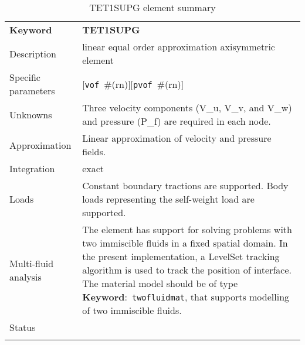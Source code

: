 \documentclass[a4paper]{article}
\newcommand{\descitem}[1]{{\noindent \textbf{#1}}:}
\newcommand{\elemkeyword}[1]{\descitem{Keyword}~\param{#1}} %
\newcommand{\param}[1]{\texttt{#1}} %
\newcommand{\optional}[1]{[#1]} %
\newcommand{\field}[2]{\param{#1}~\#{\tiny(#2)}} %
\newcommand{\optField}[2]{\optional{\field{#1}{#2}}}
\newcommand{\templabel}{}%
\newcommand{\tempcaption}{}%
\newcounter{nelpar}
\newenvironment{elementsummary}[5]{%
  \gdef\tempcaption{#4}%
  \gdef\templabel{#5}%
  \setcounter{nelpar}{0}%
  \begin{center} %
    \begin{table}[!htb] %
      \begin{tabular}{|l|p{9cm}|}\hline %
        {\bf Keyword} & \bf{#1}\\ %
        {Description} & {#2}\\ %
        {Specific parameters} & {#3}\\ \hline %
}{
  \\ \hline %
      \end{tabular}%
      \caption{\tempcaption}%
      \label{\templabel}%
    \end{table}%
  \end{center}%
}
\newcommand{\elementDescription}[2]{{#1} & {#2}\\ }
\begin{document}
\begin{elementsummary}{TET1SUPG}{linear equal order approximation axisymmetric element}
  {\optField{vof}{rn}\optField{pvof}{rn}}{TET1SUPG element summary}{TET1SUPGsummary}
\elementDescription{Unknowns}{Three velocity components (V\_u, V\_v, and V\_w) and pressure (P\_f) are required in each node.}
\elementDescription{Approximation}{Linear approximation of velocity and pressure fields.}
\elementDescription{Integration}{exact}
\elementDescription{Loads}{Constant boundary tractions are supported. Body loads
representing the self-weight load are supported.}
\elementDescription{Multi-fluid analysis}{The element has support for solving
problems with two immiscible fluids in
a fixed spatial domain. In the present implementation, a LevelSet tracking algorithm
is used to track the position of interface. 
The material model should be of type \elemkeyword{twofluidmat}, that
supports modelling of two immiscible fluids.}
\elementDescription{Status}{}
\end{elementsummary}


\printbibliography
\end{document}
